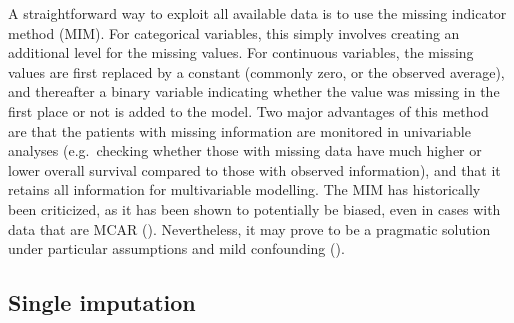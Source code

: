 \documentclass[
  letterpaper,
  DIV=11,
  numbers=noendperiod]{scrreprt}
\begin{document}
A straightforward way to exploit all available data is to use the
missing indicator method (MIM). For categorical variables, this simply
involves creating an additional level for the missing values. For
continuous variables, the missing values are first replaced by a
constant (commonly zero, or the observed average), and thereafter a
binary variable indicating whether the value was missing in the first
place or not is added to the model. Two major advantages of this method
are that the patients with missing information are monitored in
univariable analyses (e.g.~checking whether those with missing data have
much higher or lower overall survival compared to those with observed
information), and that it retains all information for multivariable
modelling. The MIM has historically been criticized, as it has been
shown to potentially be biased, even in cases with data that are MCAR
(). Nevertheless, it may prove to be a pragmatic solution
under particular assumptions and mild confounding
().

\subsection{Single imputation}\label{single-imputation}
\end{document}
